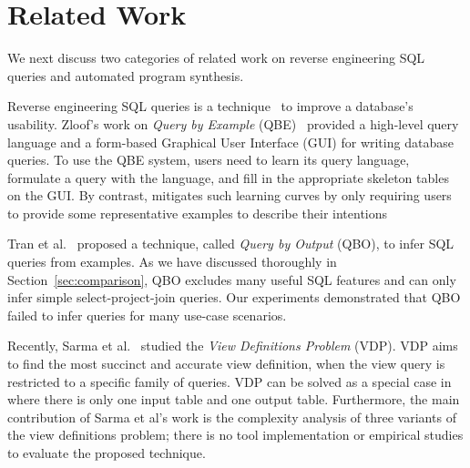 
\section{Related Work}
\label{sec:related}

\vspace{-1mm}


We next discuss two categories
of related work on reverse engineering SQL queries 
and automated program synthesis.



Reverse engineering SQL queries is a technique~\cite{Zloof:1975, Tran:2009, DasSarma:2010} to
improve a database's usability. 
Zloof's work on \textit{Query by Example} (QBE)~\cite{Zloof:1975}
provided a high-level query language and a
form-based Graphical User Interface (GUI) for
writing database queries. To use the QBE system, 
users need to learn its query language,
formulate a query with the language, and fill in
the appropriate skeleton tables on the GUI.
By contrast, \ourtool mitigates such learning curves
by only requiring users to provide some representative
examples to describe their intentions




Tran et al.~\cite{Tran:2009} proposed a technique,
called \textit{Query by Output} (QBO), to infer SQL queries from examples.
As we have discussed thoroughly in Section~\ref{sec:comparison},
QBO excludes many useful SQL features and can only
infer simple select-project-join queries.
Our experiments demonstrated that QBO failed
to infer queries for many use-case scenarios.

Recently, Sarma et al.~\cite{DasSarma:2010} studied the \textit{View Definitions Problem} (VDP).
VDP aims to find the most
succinct and accurate view definition, when
the view query is restricted to a specific family of queries.
VDP can be solved as a special case in \ourtool where there is only one
input table and one output table. Furthermore, the main contribution
of Sarma et al's work is the complexity analysis of
three variants of the view definitions problem; there is no
tool implementation or empirical studies to evaluate
the proposed technique.

